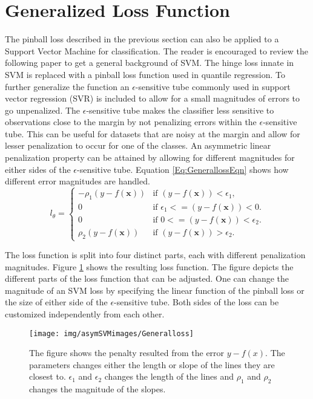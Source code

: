 \documentclass[twoside,11pt]{article}
\begin{document}
\section{Generalized Loss Function}\label{generalform}
The pinball loss described in the previous section can also be applied to a Support Vector Machine for classification. The reader is encouraged to review the following paper \citep{Vapnik98} to get a general background of SVM. The hinge loss innate in SVM is replaced with a pinball loss function used in quantile regression. To further generalize the function an $\epsilon$-sensitive tube commonly used in support vector regression (SVR) is included to allow for a small magnitudes of errors to go unpenalized. The $\epsilon$-sensitive tube makes the classifier less sensitive to observations close to the margin by not penalizing errors within the $\epsilon$-sensitive tube. This can be useful for datasets that are noisy at the margin and allow for lesser penalization to occur for one of the classes. An asymmetric linear penalization property can be attained by allowing for different magnitudes for either sides of the $\epsilon$-sensitive tube. Equation \ref{Eq:GenerallossEqn} shows how different error magnitudes are handled.
\begin{equation}\label{Eq:GenerallossEqn}
l_{\theta}=\begin{cases} 
	-\rho_1(y-f(\mathbf{x})) & \text{if $(y-f(\mathbf{x}))< \epsilon_1$,} \\
 0  &\text{if $\epsilon_1<=(y-f(\mathbf{x}))< 0$.} \\
 0  &\text{if $0<=(y-f(\mathbf{x}))< \epsilon_2$.} \\
 \rho_2(y-f(\mathbf{x})) &\text{if $(y-f(\mathbf{x}))>\epsilon_2$.}
\end{cases}
\end{equation}

The loss function is split into four distinct parts, each with different penalization magnitudes. Figure \ref{Fig:General Loss} shows the resulting loss function. The figure depicts the different parts of the loss function that can be adjusted. One can change the magnitude of an SVM loss by specifying the linear function of the pinball loss or the size of either side of the $\epsilon$-sensitive tube. Both sides of the loss can be customized independently from each other.
\begin{figure}
 \centering
\texttt{[image: img/asymSVMimages/Generalloss]}\\
 \caption{The figure shows the penalty resulted from the error $y-f(x)$. The parameters changes either the length or slope of the lines they are closest to. $\epsilon_1$ and $\epsilon_2$ changes the length of the lines and $\rho_1$ and $\rho_2$ changes the magnitude of the slopes.}
 \label{Fig:General Loss}
\end{figure}
\end{document}

